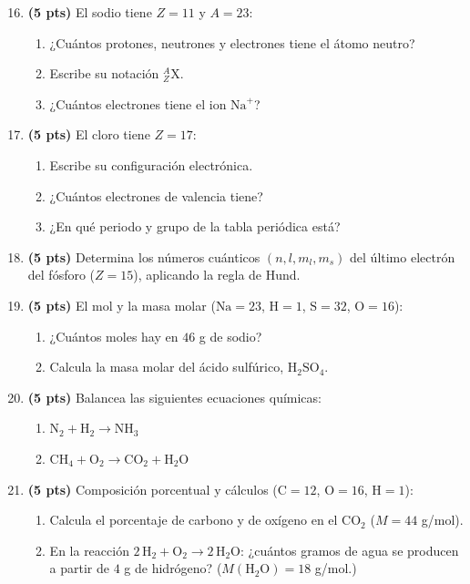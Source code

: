 \documentclass[12pt, letterpaper]{article}
\begin{document}
\begin{enumerate}[leftmargin=*]
  \setcounter{enumi}{15}
  \item \textbf{(5 pts)} El sodio tiene $Z = 11$ y $A = 23$:
        \begin{enumerate}[label=\alph*)]
          \item ¿Cuántos protones, neutrones y electrones tiene el átomo neutro?
          \item Escribe su notación ${}^{A}_{Z}\text{X}$.
          \item ¿Cuántos electrones tiene el ion $\text{Na}^{+}$?
        \end{enumerate}

  \item \textbf{(5 pts)} El cloro tiene $Z = 17$:
        \begin{enumerate}[label=\alph*)]
          \item Escribe su configuración electrónica.
          \item ¿Cuántos electrones de valencia tiene?
          \item ¿En qué periodo y grupo de la tabla periódica está?
        \end{enumerate}

  \item \textbf{(5 pts)} Determina los números cuánticos $(n, l, m_l, m_s)$ del último electrón del fósforo ($Z = 15$), aplicando la regla de Hund.

  \item \textbf{(5 pts)} El mol y la masa molar ($\text{Na} = 23$, $\text{H} = 1$, $\text{S} = 32$, $\text{O} = 16$):
        \begin{enumerate}[label=\alph*)]
          \item ¿Cuántos moles hay en $46$ g de sodio?
          \item Calcula la masa molar del ácido sulfúrico, $\text{H}_2\text{SO}_4$.
        \end{enumerate}

  \item \textbf{(5 pts)} Balancea las siguientes ecuaciones químicas:
        \begin{enumerate}[label=\alph*)]
          \item $\text{N}_2 + \text{H}_2 \rightarrow \text{NH}_3$
          \item $\text{CH}_4 + \text{O}_2 \rightarrow \text{CO}_2 + \text{H}_2\text{O}$
        \end{enumerate}

  \item \textbf{(5 pts)} Composición porcentual y cálculos ($\text{C} = 12$, $\text{O} = 16$, $\text{H} = 1$):
        \begin{enumerate}[label=\alph*)]
          \item Calcula el porcentaje de carbono y de oxígeno en el $\text{CO}_2$ ($M = 44$ g/mol).
          \item En la reacción $2\,\text{H}_2 + \text{O}_2 \rightarrow 2\,\text{H}_2\text{O}$: ¿cuántos gramos de agua se producen a partir de $4$ g de hidrógeno? ($M(\text{H}_2\text{O}) = 18$ g/mol.)
        \end{enumerate}
\end{enumerate}
\end{document}
